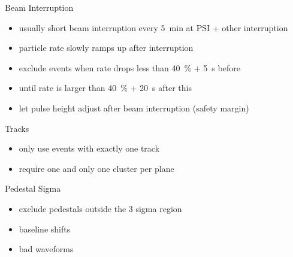 \begin{frame}[noframenumbering]{Beam Interruption}
	

	\begin{itemize}\itemfill
		\item<1-> usually short beam interruption every \SI{5}{\minute} at PSI + other interruption
		\item<2-> particle rate slowly ramps up after interruption
		\item<2-> exclude events when rate drops less than \SI{40}{\%} + \SI{5}{\second} before
		\item<2->  until rate is larger than \SI{40}{\%} + \SI{20}{\second} after this
		\item<2-> let pulse height adjust after beam interruption (safety margin)
	\end{itemize}
	
\end{frame}
\begin{frame}[noframenumbering]{Tracks}
	

	\begin{itemize}\itemfill
		\item only use events with exactly one track
		\item require one and only one cluster per plane
	\end{itemize}
	
\end{frame}
\begin{frame}[noframenumbering]{Pedestal Sigma}
	

	\begin{itemize}\itemfill
		\item exclude pedestals outside the 3 sigma region
		\item baseline shifts
		\item bad waveforms
	\end{itemize}
	
\end{frame}
